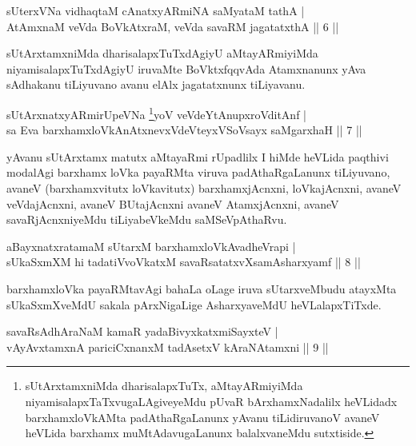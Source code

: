 
\begin{shl}
sUterxVNa vidhaqtaM cAnatxyARmiNA saMyataM tathA |\\
AtAmxnaM veVda BoVkAtxraM, veVda savaRM jagatatxthA \hfill || 6 ||
\end{shl}

\begin{artha}
sUtArxtamxniMda dharisalapxTuTxdAgiyU aMtayARmiyiMda niyamisalapxTuTxdAgiyU iruvaMte BoVktxfqqvAda Atamxnanunx yAva sAdhakanu tiLiyuvano avanu elAlx jagatatxnunx tiLiyavanu.
\end{artha}

\begin{shl}
sUtArxnatxyARmirUpeVNa \footnote{sUtArxtamxniMda dharisalapxTuTx, aMtayARmiyiMda niyamisalapxTaTxvugaLAgiveyeMdu pUvaR bArxhamxNadalilx heVLidadx barxhamxloVkAMta padAthaRgaLanunx yAvanu tiLidiruvanoV avaneV heVLida barxhamx muMtAdavugaLanunx balalxvaneMdu sutxtiside.}yoV veVdeYtAnupxroVditAnf |\\
sa Eva barxhamxloVkAnAtxnevxVdeVteyxVSoV\s sayx saMgarxhaH \hfill || 7 ||
\end{shl}

\begin{artha}
yAvanu sUtArxtamx matutx aMtayaRmi rUpadlilx I hiMde heVLida paqthivi modalAgi barxhamx loVka payaRMta viruva padAthaRgaLanunx tiLiyuvano, avaneV (barxhamxvitutx loVkavitutx) barxhamxjAcnxni, loVkajAcnxni, avaneV veVdajAcnxni, avaneV BUtajAcnxni avaneV AtamxjAcnxni, avaneV savaRjAcnxniyeMdu tiLiyabeVkeMdu saMSeVpAthaRvu.
\end{artha}

\begin{shl}
aBayxnatxratamaM sUtarxM barxhamxloVkAvadheVrapi |\\
sUkaSxmXM hi tadatiVvoVkatxM savaRsatatxvXsamAsharxyamf \hfill || 8 ||
\end{shl}

\begin{artha}%
barxhamxloVka payaRMtavAgi bahaLa oLage iruva sUtarxveMbudu atayxMta sUkaSxmXveMdU sakala pArxNigaLige AsharxyaveMdU heVLalapxTiTxde.
\end{artha}

\begin{shl}
savaRsAdhAraNaM kamaR yadaBivyxkatxmiSayxteV |\\
vAyAvxtamxnA pariciCxnanxM tadAsetxV kAraNAtamxni \hfill || 9 ||
\end{shl}

